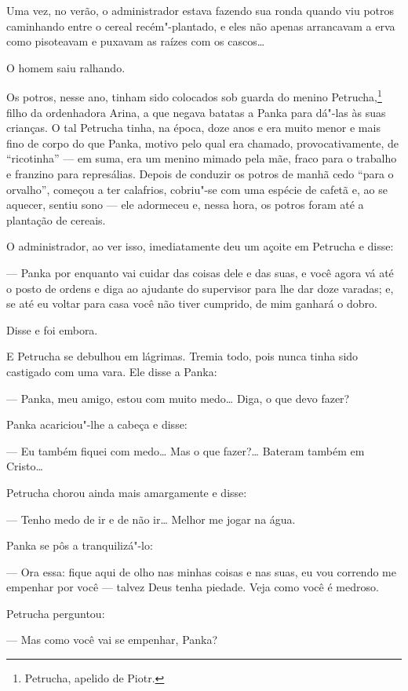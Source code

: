 Uma vez, no verão, o administrador estava fazendo sua ronda quando viu
potros caminhando entre o cereal recém"-plantado, e eles não apenas
arrancavam a erva como pisoteavam e puxavam as raízes com os cascos\ldots{}

O homem saiu ralhando.

Os potros, nesse ano, tinham sido colocados sob guarda do menino
Petrucha,\footnote{Petrucha, apelido de Piotr.} filho da ordenhadora
Arina, a que negava batatas a Panka para dá"-las às suas crianças. O tal
Petrucha tinha, na época, doze anos e era muito menor e mais fino de
corpo do que Panka, motivo pelo qual era chamado, provocativamente, de
``ricotinha'' --- em suma, era um menino mimado pela mãe, fraco para o
trabalho e franzino para represálias. Depois de conduzir os potros de
manhã cedo ``para o orvalho'', começou a ter calafrios, cobriu"-se com
uma espécie de cafetã e, ao se aquecer, sentiu sono --- ele adormeceu e,
nessa hora, os potros foram até a plantação de cereais.

O administrador, ao ver isso, imediatamente deu um açoite em Petrucha e
disse:

--- Panka por enquanto vai cuidar das coisas dele e das suas, e você
agora vá até o posto de ordens e diga ao ajudante do supervisor para lhe
dar doze varadas; e, se até eu voltar para casa você não tiver cumprido,
de mim ganhará o dobro.

Disse e foi embora.

E Petrucha se debulhou em lágrimas. Tremia todo, pois nunca tinha sido
castigado com uma vara. Ele disse a Panka:

--- Panka, meu amigo, estou com muito medo\ldots{} Diga, o que devo fazer?

Panka acariciou"-lhe a cabeça e disse:

--- Eu também fiquei com medo\ldots{} Mas o que fazer?\ldots{} Bateram também em
Cristo\ldots{}

Petrucha chorou ainda mais amargamente e disse:

--- Tenho medo de ir e de não ir\ldots{} Melhor me jogar na água.

Panka se pôs a tranquilizá"-lo:

--- Ora essa: fique aqui de olho nas minhas coisas e nas suas, eu vou
correndo me empenhar por você --- talvez Deus tenha piedade. Veja como
você é medroso.

Petrucha perguntou:

--- Mas como você vai se empenhar, Panka?

